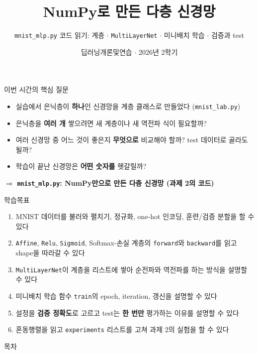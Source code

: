 \documentclass[aspectratio=169,11pt]{beamer}
\title{NumPy로 만든 다층 신경망}
\subtitle{\texttt{mnist\_mlp.py} 코드 읽기: 계층 $\cdot$ \texttt{MultiLayerNet} $\cdot$ 미니배치 학습 $\cdot$ 검증과 test}
\date{딥러닝개론및연습 $\cdot$ 2026년 2학기}
\newcommand{\code}[1]{\texttt{#1}}
\begin{document}
\begin{frame}[plain]
\titlepage
\end{frame}

\begin{frame}{이번 시간의 핵심 질문}
\begin{keybox}[이번 시간의 핵심 질문]
\begin{itemize}
\item 실습에서 은닉층이 \textbf{하나}인 신경망을 계층 클래스로 만들었다 (\code{mnist\_lab.py})
\item 은닉층을 \textbf{여러 개} 쌓으려면 새 계층이나 새 역전파 식이 필요할까?
\item 여러 신경망 중 어느 것이 좋은지 \textbf{무엇으로} 비교해야 할까? test 데이터로 골라도 될까?
\item 학습이 끝난 신경망은 \textbf{어떤 숫자를} 헷갈릴까?
\end{itemize}
\end{keybox}
\vskip2mm
\begin{center}
\large $\Rightarrow$ \textbf{\code{mnist\_mlp.py}: NumPy만으로 만든 다층 신경망 (과제 2의 코드)}
\end{center}
\end{frame}

\begin{frame}{학습목표}
\begin{enumerate}
\item MNIST 데이터를 불러와 펼치기, 정규화, one-hot 인코딩, 훈련/검증 분할을 할 수 있다
\item \code{Affine}, \code{Relu}, \code{Sigmoid}, Softmax-손실 계층의 \code{forward}와 \code{backward}를 읽고 shape을 따라갈 수 있다
\item \code{MultiLayerNet}이 계층을 리스트에 쌓아 순전파와 역전파를 하는 방식을 설명할 수 있다
\item 미니배치 학습 함수 \code{train}의 epoch, iteration, 갱신을 설명할 수 있다
\item 설정을 \textbf{검증 정확도}로 고르고 test는 \textbf{한 번만} 평가하는 이유를 설명할 수 있다
\item 혼동행렬을 읽고 \code{experiments} 리스트를 고쳐 과제 2의 실험을 할 수 있다
\end{enumerate}
\end{frame}

\begin{frame}{목차}
\small
\tableofcontents
\end{frame}
\end{document}
